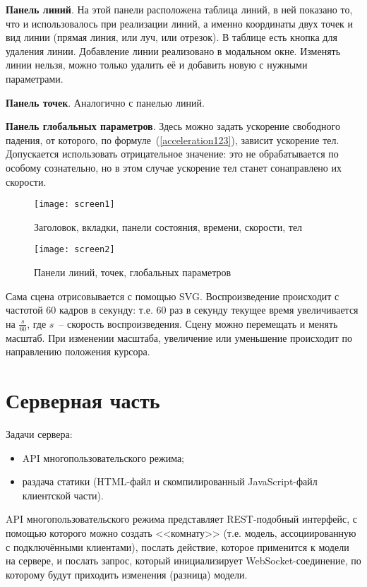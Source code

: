 \textbf{Панель линий}. На этой панели расположена таблица линий, в ней 
показано то, что и использовалось при реализации линий, 
а именно координаты двух точек и вид линии (прямая линия, или луч, или отрезок).
В таблице есть кнопка для удаления линии. Добавление линии реализовано в модальном окне.
Изменять линии нельзя, можно только удалить её и добавить новую с нужными параметрами.

\textbf{Панель точек}. Аналогично с панелью линий.

\textbf{Панель глобальных параметров}. Здесь можно задать ускорение
свободного падения, от которого, по формуле~(\ref{acceleration123}), зависит ускорение тел.
Допускается использовать отрицательное значение: это не обрабатывается по особому сознательно,
но в этом случае ускорение тел станет сонаправлено их скорости.

\begin{figure}[H]
    \centering
    \texttt{[image: screen1]}
    \caption{Заголовок, вкладки, панели состояния, времени, скорости, тел\label{screen1fig}}
\end{figure}

\begin{figure}[H]
    \centering
    \texttt{[image: screen2]}
    \caption{Панели линий, точек, глобальных параметров\label{screen2fig}}
\end{figure}

Сама сцена отрисовывается с помощью SVG. Воспроизведение происходит с частотой 60 кадров в секунду:
т.е. 60 раз в секунду текущее время увеличивается на \(\frac{s}{60}\), где \(s\)~-- скорость воспроизведения.
Сцену можно перемещать и менять масштаб. При изменении масштаба, увеличение или уменьшение происходит по направлению положения курсора.

\section{Серверная часть}\label{serverimpl}

Задачи сервера:

\begin{itemize}
    \item API многопользовательского режима;
    \item раздача статики (HTML-файл и скомпилированный JavaScript-файл клиентской части).
\end{itemize}

API многопользовательского режима представляет REST-подобный интерфейс,
с помощью которого можно создать <<комнату>> (т.е. модель, ассоциированную с подключёнными клиентами),
послать действие, которое применится к модели на сервере, и послать запрос, который инициализирует WebSocket-соединение,
по которому будут приходить изменения (разница) модели.

